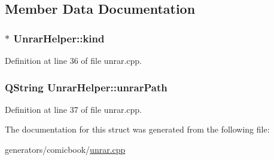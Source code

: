 \subsection{Member Data Documentation}
\hypertarget{structUnrarHelper_aba5cb684d3b2f784d1333694fd46a1ec}{
\subsubsection[{kind}]{$\ast$ Unrar\+Helper\+::kind}}\label{structUnrarHelper_aba5cb684d3b2f784d1333694fd46a1ec}


Definition at line 36 of file unrar.\+cpp.

\hypertarget{structUnrarHelper_a95a1f346389bf8fb5bb408fc23924eea}{
\subsubsection[{unrar\+Path}]{\setlength{\rightskip}{0pt plus 5cm}Q\+String Unrar\+Helper\+::unrar\+Path}}\label{structUnrarHelper_a95a1f346389bf8fb5bb408fc23924eea}


Definition at line 37 of file unrar.\+cpp.



The documentation for this struct was generated from the following file\+:\begin{DoxyCompactItemize}
\item 
generators/comicbook/\hyperlink{unrar_8cpp}{unrar.\+cpp}\end{DoxyCompactItemize}
